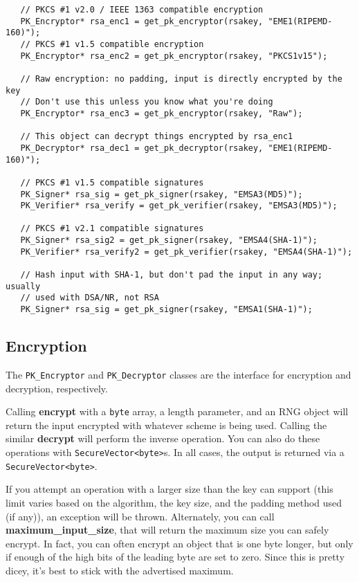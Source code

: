 \documentclass{article}
\newcommand{\function}[1]{\textbf{#1}}
\newcommand{\type}[1]{\texttt{#1}}
\begin{document}
\begin{verbatim}
   // PKCS #1 v2.0 / IEEE 1363 compatible encryption
   PK_Encryptor* rsa_enc1 = get_pk_encryptor(rsakey, "EME1(RIPEMD-160)");
   // PKCS #1 v1.5 compatible encryption
   PK_Encryptor* rsa_enc2 = get_pk_encryptor(rsakey, "PKCS1v15");

   // Raw encryption: no padding, input is directly encrypted by the key
   // Don't use this unless you know what you're doing
   PK_Encryptor* rsa_enc3 = get_pk_encryptor(rsakey, "Raw");

   // This object can decrypt things encrypted by rsa_enc1
   PK_Decryptor* rsa_dec1 = get_pk_decryptor(rsakey, "EME1(RIPEMD-160)");

   // PKCS #1 v1.5 compatible signatures
   PK_Signer* rsa_sig = get_pk_signer(rsakey, "EMSA3(MD5)");
   PK_Verifier* rsa_verify = get_pk_verifier(rsakey, "EMSA3(MD5)");

   // PKCS #1 v2.1 compatible signatures
   PK_Signer* rsa_sig2 = get_pk_signer(rsakey, "EMSA4(SHA-1)");
   PK_Verifier* rsa_verify2 = get_pk_verifier(rsakey, "EMSA4(SHA-1)");

   // Hash input with SHA-1, but don't pad the input in any way; usually
   // used with DSA/NR, not RSA
   PK_Signer* rsa_sig = get_pk_signer(rsakey, "EMSA1(SHA-1)");
\end{verbatim}

\subsection{Encryption}

The \type{PK\_Encryptor} and \type{PK\_Decryptor} classes are the interface for
encryption and decryption, respectively.

Calling \function{encrypt} with a \type{byte} array, a length
parameter, and an RNG object will return the input encrypted with
whatever scheme is being used. Calling the similar \function{decrypt}
will perform the inverse operation. You can also do these operations
with \type{SecureVector<byte>}s. In all cases, the output is returned
via a \type{SecureVector<byte>}.

If you attempt an operation with a larger size than the key can
support (this limit varies based on the algorithm, the key size, and
the padding method used (if any)), an exception will be
thrown. Alternately, you can call \function{maximum\_input\_size},
that will return the maximum size you can safely encrypt. In fact,
you can often encrypt an object that is one byte longer, but only if
enough of the high bits of the leading byte are set to zero. Since
this is pretty dicey, it's best to stick with the advertised maximum.
\end{document}
